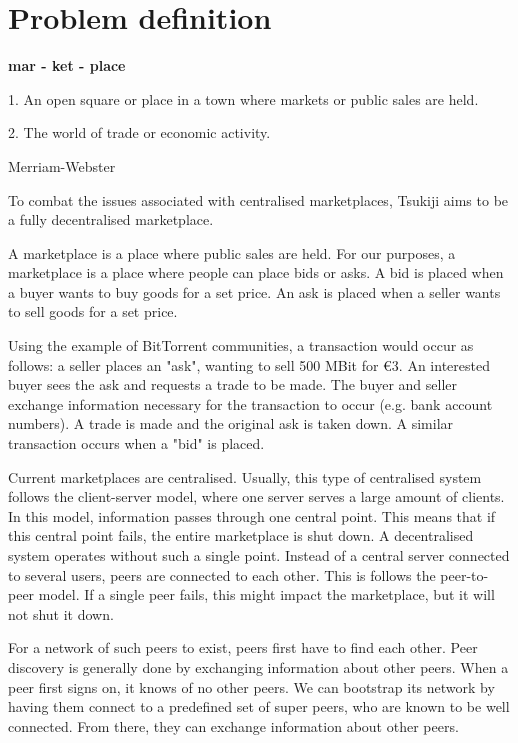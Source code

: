 \section{Problem definition}
\epigraph{\textbf{mar - ket - place}

1. An open square or place in a town where markets or public sales are held.

2. The world of trade or economic activity.}{Merriam-Webster}

To combat the issues associated with centralised marketplaces, Tsukiji aims to be a fully decentralised marketplace.

A marketplace is a place where public sales are held.
For our purposes, a marketplace is a place where people can place bids or asks.
A bid is placed when a buyer wants to buy goods for a set price.
An ask is placed when a seller wants to sell goods for a set price.

Using the example of BitTorrent communities, a transaction would occur as follows: a seller places an "ask", wanting to sell 500 MBit for €3.
An interested buyer sees the ask and requests a trade to be made.
The buyer and seller exchange information necessary for the transaction to occur (e.g. bank account numbers).
A trade is made and the original ask is taken down.
A similar transaction occurs when a "bid" is placed.

Current marketplaces are centralised.
Usually, this type of centralised system follows the client-server model, where one server serves a large amount of clients.
In this model, information passes through one central point.
This means that if this central point fails, the entire marketplace is shut down.
A decentralised system operates without such a single point.
Instead of a central server connected to several users, peers are connected to each other.
This is follows the peer-to-peer model.
If a single peer fails, this might impact the marketplace, but it will not shut it down.

For a network of such peers to exist, peers first have to find each other.
Peer discovery is generally done by exchanging information about other peers.
When a peer first signs on, it knows of no other peers.
We can bootstrap its network by having them connect to a predefined set of super peers, who are known to be well connected.
From there, they can exchange information about other peers.